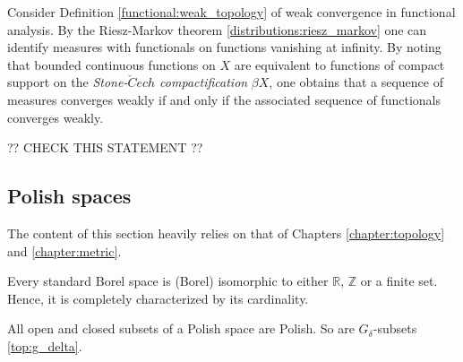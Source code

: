     \begin{remark}
        Consider Definition \ref{functional:weak_topology} of weak convergence in functional analysis. By the Riesz-Markov theorem \ref{distributions:riesz_markov} one can identify measures with functionals on functions vanishing at infinity. By noting that bounded continuous functions on $X$ are equivalent to functions of compact support on the \textit{Stone-$\check{C}ech$ compactification} $\beta X$, one obtains that a sequence of measures converges weakly if and only if the associated sequence of functionals converges weakly.

        ?? CHECK THIS STATEMENT ??
    \end{remark}

\subsection{Polish spaces}

    The content of this section heavily relies on that of Chapters \ref{chapter:topology} and \ref{chapter:metric}.


    \begin{theorem}[Kuratowski]
        Every standard Borel space is (Borel) isomorphic to either $\mathbb{R}$, $\mathbb{Z}$ or a finite set. Hence, it is completely characterized by its cardinality.
    \end{theorem}

    \begin{property}
        All open and closed subsets of a Polish space are Polish. So are $G_\delta$-subsets \ref{top:g_delta}.
    \end{property}


